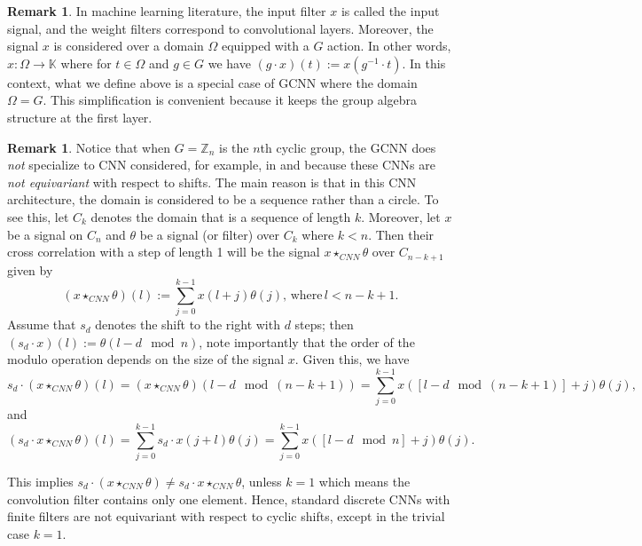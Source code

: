 \documentclass[final]{article}
\newcommand{\K}{\mathbb{K}}
\newcommand{\Z}{\mathbb{Z}}
\newcommand{\ccr}{\star}
\theoremstyle{definition}
\newtheorem{remark}[definition]{Remark}
\theoremstyle{plain}
\begin{document}
\begin{remark}
    In machine learning literature, the input filter $x$ is called the input signal, and the weight filters correspond to convolutional layers. 
    Moreover, the signal $x$ is considered over a domain $\Omega$ equipped with a $G$ action. In other words, $x: \Omega \to \K$ where for $t\in \Omega$ and $g\in G$ we have $(g\cdot x)(t) := x(g^{-1}\cdot t)$. 
    In this context, what we define above is a special case of GCNN where the domain $\Omega = G$.
    This simplification is convenient because it keeps the group algebra structure at the first layer.
\end{remark}

\begin{remark}
Notice that when $G=\Z_n$ is the $n$th cyclic group, the GCNN does \emph{not} specialize to CNN considered, for example, in \cite{kohn2022geometrylinearconvolutionalnetworks} and \cite{shahverdi2024geometryoptimizationpolynomialconvolutional} because these CNNs are  \emph{not equivariant} with respect to shifts.
The main reason is that in this CNN architecture, the domain is considered to be a sequence rather than a circle.
To see this, let $C_k$ denotes the domain that is a sequence of length $k$. 
Moreover, let $x$ be a signal on $C_n$ and $\theta$ be a signal (or filter) over $C_k$ where $k< n$.
Then their cross correlation with a step of length 1 will be the signal $x \ccr_{CNN} \theta$ over $C_{n-k+1}$ given by
\[
(x \ccr_{CNN} \theta)(l) := \sum_{j=0}^{k-1} x(l+j) \theta(j) , \, \text{where} \, l < n-k+1.
\]
Assume that $s_d$ denotes the shift to the right with $d$ steps; then 
$(s_d \cdot x) (l) := \theta(l-d \mod n)$, note importantly that the order of the modulo operation depends on the size of the signal $x$.
Given this, we have
\[
s_d \cdot(x \ccr_{CNN} \theta)(l) = (x \ccr_{CNN} \theta)(l-d \mod (n-k+1)) = \sum_{j=0}^{k-1}  x( [l-d \mod (n-k+1)] + j) \theta(j) ,
\]
and
\[
(s_d \cdot x \ccr_{CNN}  \theta)(l) = \sum_{j=0}^{k-1} s_d \cdot x(j + l) \theta(j)  = \sum_{j=0}^{k-1} x([l - d \mod n] + j) \theta(j) .
\]

This implies $s_d \cdot(x \ccr_{CNN} \theta) \neq s_d \cdot x \ccr_{CNN}  \theta$, unless $k=1$ which means the convolution filter contains only one element.
Hence, standard discrete CNNs with finite filters are not equivariant with respect to cyclic shifts, except in the trivial case $k=1$.
\end{remark}
\end{document}
